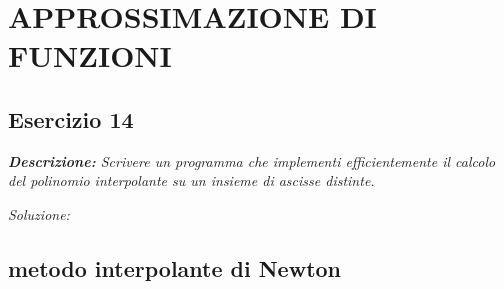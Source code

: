 \chapter{APPROSSIMAZIONE DI FUNZIONI}
\section{Esercizio 14}

\textit{\textbf{Descrizione:} Scrivere un programma che implementi efficientemente il calcolo del polinomio interpolante su un insieme di ascisse distinte.}\newline

\noindent\emph{Soluzione: }\newline

\section*{metodo interpolante di Newton}

\newpage
\newpage